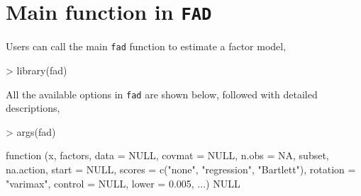 \documentclass{article}
\begin{document}
\section{Main function in \texttt{FAD}}
\label{sec:fad}
Users can call the main \texttt{fad} function to estimate a factor model,
\begin{Schunk}
\begin{Sinput}
> library(fad)
\end{Sinput}
\end{Schunk}
All the available options in \texttt{fad} are shown below, followed with detailed descriptions,
\begin{Schunk}
\begin{Sinput}
> args(fad)
\end{Sinput}
\begin{Soutput}
function (x, factors, data = NULL, covmat = NULL, n.obs = NA, 
    subset, na.action, start = NULL, scores = c("none", "regression", 
        "Bartlett"), rotation = "varimax", control = NULL, lower = 0.005, 
    ...) 
NULL
\end{Soutput}
\end{Schunk}
\end{document}
